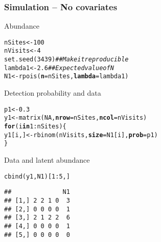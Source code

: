 \documentclass[color=usenames,dvipsnames]{beamer}\usepackage[]{graphicx}\usepackage[]{color}
\makeatletter
\newcommand{\hlnum}[1]{\textcolor[rgb]{0.69,0.494,0}{#1}}%
\newcommand{\hlcom}[1]{\textcolor[rgb]{0.514,0.506,0.514}{\textit{#1}}}%
\newcommand{\hlopt}[1]{\textcolor[rgb]{0,0,0}{#1}}%
\newcommand{\hlstd}[1]{\textcolor[rgb]{0,0,0}{#1}}%
\newcommand{\hlkwa}[1]{\textcolor[rgb]{0,0,0}{\textbf{#1}}}%
\newcommand{\hlkwb}[1]{\textcolor[rgb]{0,0.341,0.682}{#1}}%
\newcommand{\hlkwc}[1]{\textcolor[rgb]{0,0,0}{\textbf{#1}}}%
\newcommand{\hlkwd}[1]{\textcolor[rgb]{0.004,0.004,0.506}{#1}}%
\newenvironment{kframe}{%
 \def\at@end@of@kframe{}%
 \ifinner\ifhmode%
  \def\at@end@of@kframe{\end{minipage}}%
  \begin{minipage}{\columnwidth}%
 \fi\fi%
 \def\FrameCommand##1{\hskip\@totalleftmargin \hskip-\fboxsep
 \colorbox{shadecolor}{##1}\hskip-\fboxsep
     \hskip-\linewidth \hskip-\@totalleftmargin \hskip\columnwidth}%
 \MakeFramed {\advance\hsize-\width
   \@totalleftmargin\z@ \linewidth\hsize
   \@setminipage}}%
 {\par\unskip\endMakeFramed%
 \at@end@of@kframe}
\newenvironment{knitrout}{}{} %
\makeatother
\begin{document}
\begin{frame}[fragile]
  \frametitle{Simulation -- No covariates}
  \small
  Abundance
\begin{knitrout}\scriptsize
{}\color{fgcolor}\begin{kframe}
\begin{alltt}
\hlstd{nSites} \hlkwb{<-} \hlnum{100}
\hlstd{nVisits} \hlkwb{<-} \hlnum{4}
\hlkwd{set.seed}\hlstd{(}\hlnum{3439}\hlstd{)}  \hlcom{## Make it reproducible}
\hlstd{lambda1} \hlkwb{<-} \hlnum{2.6}  \hlcom{## Expected value of N}
\hlstd{N1} \hlkwb{<-} \hlkwd{rpois}\hlstd{(}\hlkwc{n}\hlstd{=nSites,} \hlkwc{lambda}\hlstd{=lambda1)}
\end{alltt}
\end{kframe}
\end{knitrout}
  \pause
  \vfill
  Detection probability and data
\begin{knitrout}\scriptsize
{}\color{fgcolor}\begin{kframe}
\begin{alltt}
\hlstd{p1} \hlkwb{<-} \hlnum{0.3}
\hlstd{y1} \hlkwb{<-} \hlkwd{matrix}\hlstd{(}\hlnum{NA}\hlstd{,} \hlkwc{nrow}\hlstd{=nSites,} \hlkwc{ncol}\hlstd{=nVisits)}
\hlkwa{for}\hlstd{(i} \hlkwa{in} \hlnum{1}\hlopt{:}\hlstd{nSites) \{}
    \hlstd{y1[i,]} \hlkwb{<-} \hlkwd{rbinom}\hlstd{(nVisits,} \hlkwc{size}\hlstd{=N1[i],} \hlkwc{prob}\hlstd{=p1)}
\hlstd{\}}
\end{alltt}
\end{kframe}
\end{knitrout}
  \pause
  \vfill
  Data and latent abundance
\begin{knitrout}\scriptsize
{}\color{fgcolor}\begin{kframe}
\begin{alltt}
\hlkwd{cbind}\hlstd{(y1, N1)[}\hlnum{1}\hlopt{:}\hlnum{5}\hlstd{,]}
\end{alltt}
\begin{verbatim}
##              N1
## [1,] 2 2 1 0  3
## [2,] 0 0 0 0  1
## [3,] 2 1 2 2  6
## [4,] 0 0 0 0  1
## [5,] 0 0 0 0  0
\end{verbatim}
\end{kframe}
\end{knitrout}
\end{frame}
\end{document}
